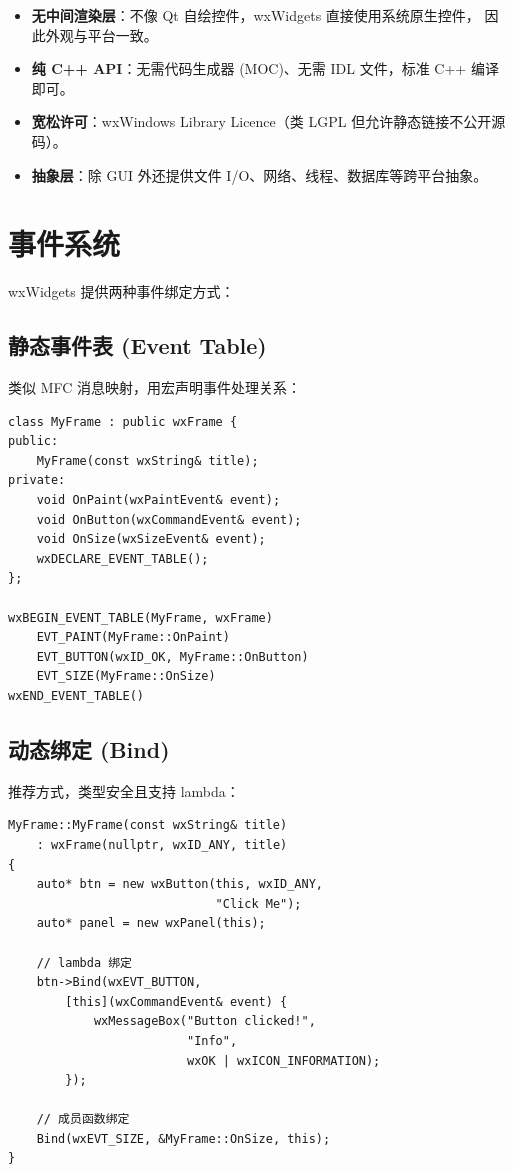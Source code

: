 \documentclass[12pt,a4paper,fontset=fandol]{ctexbook}
\newcommand{\cpplabel}{%
  \tcbox[on line,colback=cppheadbg,colframe=cppheadbg,
    boxrule=0pt,arc=1pt,left=2pt,right=2pt,top=1pt,bottom=1pt,
    colupper=white,fontupper=\scriptsize\bfseries]{C++}}
\begin{document}
\begin{itemize}
  \item \textbf{无中间渲染层}：不像 Qt 自绘控件，wxWidgets 直接使用系统原生控件，
        因此外观与平台一致。
  \item \textbf{纯 C++ API}：无需代码生成器 (MOC)、无需 IDL 文件，标准 C++ 编译即可。
  \item \textbf{宽松许可}：wxWindows Library Licence（类 LGPL 但允许静态链接不公开源码）。
  \item \textbf{抽象层}：除 GUI 外还提供文件 I/O、网络、线程、数据库等跨平台抽象。
\end{itemize}

\section{事件系统}

wxWidgets 提供两种事件绑定方式：

\subsection{静态事件表 (Event Table)}

类似 MFC 消息映射，用宏声明事件处理关系：

\cpplabel
\begin{lstlisting}[style=cppstyle]
class MyFrame : public wxFrame {
public:
    MyFrame(const wxString& title);
private:
    void OnPaint(wxPaintEvent& event);
    void OnButton(wxCommandEvent& event);
    void OnSize(wxSizeEvent& event);
    wxDECLARE_EVENT_TABLE();
};

wxBEGIN_EVENT_TABLE(MyFrame, wxFrame)
    EVT_PAINT(MyFrame::OnPaint)
    EVT_BUTTON(wxID_OK, MyFrame::OnButton)
    EVT_SIZE(MyFrame::OnSize)
wxEND_EVENT_TABLE()
\end{lstlisting}

\subsection{动态绑定 (Bind)}

推荐方式，类型安全且支持 lambda：

\cpplabel
\begin{lstlisting}[style=cppstyle]
MyFrame::MyFrame(const wxString& title)
    : wxFrame(nullptr, wxID_ANY, title)
{
    auto* btn = new wxButton(this, wxID_ANY,
                             "Click Me");
    auto* panel = new wxPanel(this);

    // lambda 绑定
    btn->Bind(wxEVT_BUTTON,
        [this](wxCommandEvent& event) {
            wxMessageBox("Button clicked!",
                         "Info",
                         wxOK | wxICON_INFORMATION);
        });

    // 成员函数绑定
    Bind(wxEVT_SIZE, &MyFrame::OnSize, this);
}
\end{lstlisting}
\end{document}
